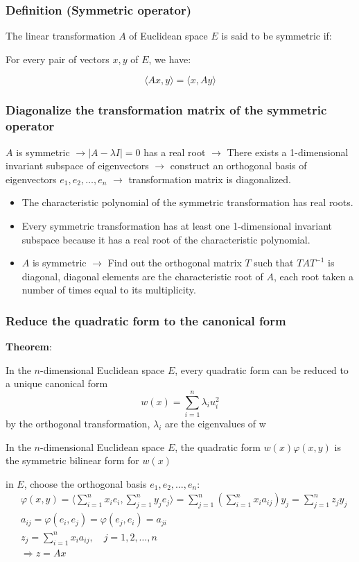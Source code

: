 \subsubsection{Definition (Symmetric operator)}

The linear transformation $A$ of Euclidean space $E$ is said to be symmetric if:

For every pair of vectors $x, y$ of $E$, we have:

\[
\langle Ax, y \rangle = \langle x, Ay \rangle
\]

\subsubsection{Diagonalize the transformation matrix of the symmetric operator}

$A$ is symmetric $\rightarrow |A - \lambda I| = 0$ has a real root $\rightarrow$ There exists a 1-dimensional invariant subspace of eigenvectors $\rightarrow$ construct an orthogonal basis of eigenvectors $e_1, e_2, \dots, e_n$ $\rightarrow$ transformation matrix is diagonalized.
\begin{itemize}
    \item The characteristic polynomial of the symmetric transformation has real roots.
    \item Every symmetric transformation has at least one 1-dimensional invariant subspace because it has a real root of the characteristic polynomial.
    \item $A$ is symmetric $\rightarrow$ Find out the orthogonal matrix $T$ such that $TAT^{-1}$ is diagonal, diagonal elements are the characteristic root of $A$, each root taken a number of times equal to its multiplicity.
\end{itemize}

\subsubsection{Reduce the quadratic form to the canonical form}
\textbf{Theorem}:

In the $n$-dimensional Euclidean space $E$, every quadratic form can be reduced to a unique canonical form 
\[
w(x) = \sum_{i=1}^n \lambda_i u_i^2
\]
by the orthogonal transformation, $\lambda_i$ are the eigenvalues of w

In the $n$-dimensional Euclidean space $E$, the quadratic form $w(x)\varphi(x,y)$ is the symmetric bilinear form for $w(x)$

in $E$, choose the orthogonal basis $e_1, e_2, \ldots, e_n$:
\begin{align*}
    &\varphi(x, y) = \langle\sum_{i=1}^nx_ie_i, \sum_{j=1}^n  y_j e_j\rangle = \sum_{j=1}^n \left(\sum_{i=1}^n x_ia_{ij}\right)y_j = \sum_{j=1}^n z_j y_j\\
    &a_{ij} = \varphi(e_i, e_j) = \varphi(e_j, e_i) = a_{ji}\\
    &z_j = \sum_{i=1}^n x_i a_{ij}, \quad j = 1, 2, \ldots, n\\
    &\Rightarrow z = Ax
\end{align*}

